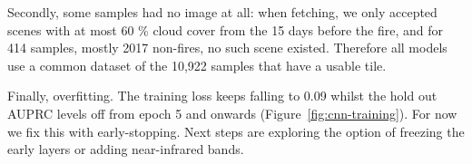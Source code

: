 Secondly, some samples had no image at all: when fetching, we only accepted scenes with at most 60 \% cloud cover from the 15 days before the fire, and for 414 samples, mostly 2017 non-fires, no such scene existed. Therefore all models use a common dataset of the 10,922 samples that have a usable tile.

Finally, overfitting. The training loss keeps falling to 0.09 whilst the hold out AUPRC levels off from epoch 5 and onwards (Figure~\ref{fig:cnn-training}). For now we fix this with early-stopping. Next steps are exploring the option of freezing the early layers or adding near-infrared bands. 

